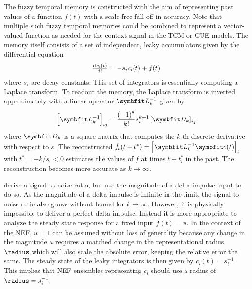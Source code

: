 The fuzzy temporal memory is constructed with the aim of representing past values of a function $f(t)$ with a scale-free fall off in accuracy.
Note that multiple such fuzzy temporal memories could be combined to represent a vector-valued function as needed for the context signal in the TCM or CUE models.
The memory itself consists of a set of independent, leaky accumulators given by the differential equation
\begin{equation}
    \od{c_i(t)}{t} = - s_i c_i(t) + f(t)
\end{equation}
where $s_i$ are decay constants.
This set of integrators is essentially computing a Laplace transform.
To readout the memory, the Laplace transform is inverted approximately with a linear operator $\mat L_k^{-1}$ given by
\begin{equation}
    \sbr{\mat L_k^{-1}}_{ij} = \frac{{(-1)}^k}{k!} s_i^{k+1} \sbr{\mat D_k}_{ij}
\end{equation}
where $\mat D_k$ is a square matrix that computes the $k$-th discrete derivative with respect to $s$.
The reconstructed $\hat{f}_t(t + t^*) = \sbr{\mat L_k^{-1} \vc c(t)}_i$ with $t^* = -k/s_i < 0$ estimates the values of $f$ at times $t + t_i^*$ in the past.
The reconstruction becomes more accurate as $k \rightarrow \infty$.

\Textcite{shankar2013} derive a signal to noise ratio, but use the magnitude of a delta impulse input to do so.
As the magnitude of a delta impulse is infinite in the limit, the signal to noise ratio also grows without bound for $k \rightarrow \infty$.
However, it is physically impossible to deliver a perfect delta impulse.
Instead it is more appropriate to analyze the steady state response for a fixed input $f(t) = u$.
In the context of the NEF, $u=1$ can be assumed without loss of generality because any change in the magnitude $u$ requires a matched change in the representational radius $\radius$ which will also scale the absolute error, keeping the relative error the same.
The steady state of the leaky integrators is then given by $c_i(t) = s_i^{-1}$.
This implies that NEF ensembles representing $c_i$ should use a radius of $\radius = s_i^{-1}$.

